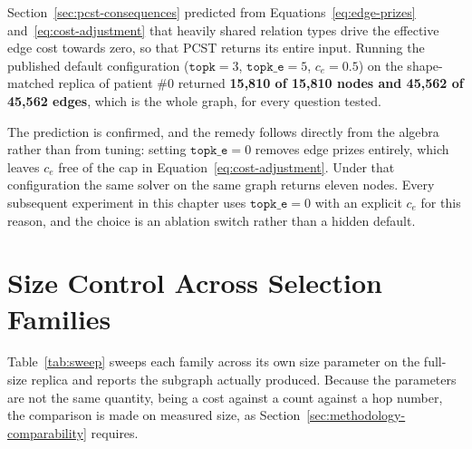 Section~\ref{sec:pcst-consequences} predicted from
Equations~\ref{eq:edge-prizes} and~\ref{eq:cost-adjustment} that heavily shared
relation types drive the effective edge cost towards zero, so that PCST returns
its entire input. Running the published default configuration
($\texttt{topk}=3$, $\texttt{topk\_e}=5$, $c_e = 0.5$) on the shape-matched
replica of patient \#0 returned \textbf{15{,}810 of 15{,}810 nodes and
45{,}562 of 45{,}562 edges}, which is the whole graph, for every question tested.

The prediction is confirmed, and the remedy follows directly from the algebra
rather than from tuning: setting $\texttt{topk\_e} = 0$ removes edge prizes
entirely, which leaves $c_e$ free of the cap in
Equation~\ref{eq:cost-adjustment}. Under that configuration the same solver on
the same graph returns eleven nodes. Every subsequent experiment in this chapter
uses $\texttt{topk\_e} = 0$ with an explicit $c_e$ for this reason, and the
choice is an ablation switch rather than a hidden default.

\section{Size Control Across Selection Families} \label{sec:results-size}

Table~\ref{tab:sweep} sweeps each family across its own size parameter on the
full-size replica and reports the subgraph actually produced. Because the
parameters are not the same quantity, being a cost against a count against a
hop number, the comparison is made on measured size, as
Section~\ref{sec:methodology-comparability} requires.

